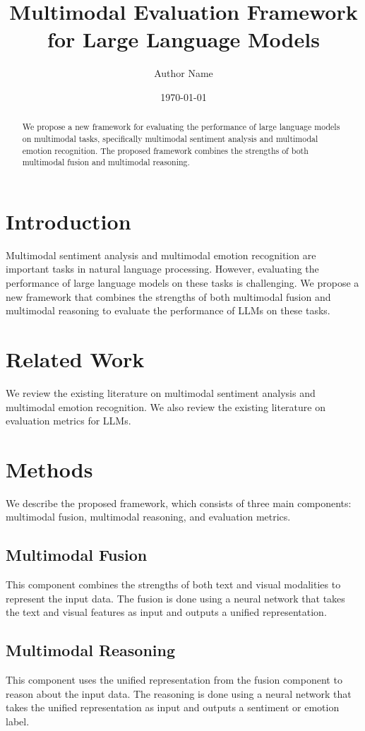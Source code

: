 \documentclass{article}
\title{Multimodal Evaluation Framework for Large Language Models}
\author{Author Name}
\date{\today}
\begin{document}
\maketitle

\begin{abstract}
We propose a new framework for evaluating the performance of large language models on multimodal tasks, specifically multimodal sentiment analysis and multimodal emotion recognition. The proposed framework combines the strengths of both multimodal fusion and multimodal reasoning.
\end{abstract}

\section{Introduction}
Multimodal sentiment analysis and multimodal emotion recognition are important tasks in natural language processing. However, evaluating the performance of large language models on these tasks is challenging. We propose a new framework that combines the strengths of both multimodal fusion and multimodal reasoning to evaluate the performance of LLMs on these tasks.

\section{Related Work}
We review the existing literature on multimodal sentiment analysis and multimodal emotion recognition. We also review the existing literature on evaluation metrics for LLMs.

\section{Methods}
We describe the proposed framework, which consists of three main components: multimodal fusion, multimodal reasoning, and evaluation metrics.

\subsection{Multimodal Fusion}
This component combines the strengths of both text and visual modalities to represent the input data. The fusion is done using a neural network that takes the text and visual features as input and outputs a unified representation.

\subsection{Multimodal Reasoning}
This component uses the unified representation from the fusion component to reason about the input data. The reasoning is done using a neural network that takes the unified representation as input and outputs a sentiment or emotion label.
\end{document}
